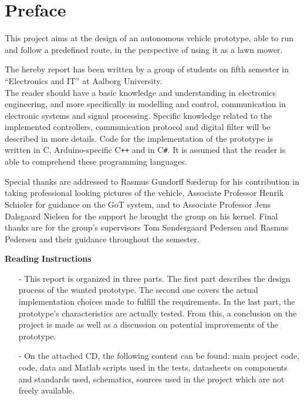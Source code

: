 \chapter*{Preface}
\vspace{-3 pt}
This project aims at the design of an autonomous vehicle prototype, able to run and follow a predefined route, in the perspective of using it as a lawn mower.

The hereby report has been written by a group of students on fifth semester in ``Electronics and IT'' at Aalborg University.\\
The reader should have a basic knowledge and understanding in electronics engineering, and more specifically in modelling and control, communication in electronic systems and signal processing. Specific knowledge related to the implemented controllers, communication protocol and digital filter will be described in more details. Code for the implementation of the prototype is written in C, Arduino-specific C\texttt{++} and in C\texttt{\#}. It is assumed that the reader is able to comprehend these programming languages.

Special thanks are addressed to Rasmus Gundorff Sæderup for his contribution in taking professional looking pictures of the vehicle, Associate Professor Henrik Schiøler for guidance on the GoT system, and to Associate Professor Jens Dalsgaard Nielsen for the support he brought the group on his kernel. Final thanks are for the group's supervisors Tom Søndergaard Pedersen and Rasmus Pedersen and their guidance throughout the semester.

\textbf{Reading Instructions}
\vspace{-7 pt}
\begin{itemize}
\item[-] This report is organized in three parts. The first part describes the design process of the wanted prototype. The second one covers the actual implementation choices made to fulfill the requirements. In the last part, the prototype's characteristics are actually tested. From this, a conclusion on the project is made as well as a discussion on potential improvements of the prototype.
\item[-] On the attached CD, the following content can be found: main project code, code, data and Matlab scripts used in the tests, datasheets on components and standards used, schematics, sources used in the project which are not freely available.
\end{itemize}



